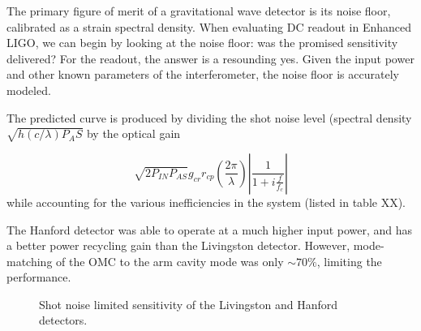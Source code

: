 \label{chapter5}


The primary figure of merit of a gravitational wave detector is its
noise floor, calibrated as a strain spectral density.  When evaluating
DC readout in Enhanced LIGO, we can begin by looking at the noise
floor: was the promised sensitivity delivered?  For the readout, the
answer is a resounding yes.  Given the input power and other known
parameters of the interferometer, the noise floor is accurately
modeled.


The predicted curve is produced by dividing the shot noise level
(spectral density $\sqrt{h (c/\lambda) P_AS}$ by the optical gain

$$\sqrt{2 P_{IN} P_{AS}} g_{cr} r_{cp}
\left(\frac{2\pi}{\lambda}\right) \left| \frac{1}{1 +
  i\frac{f}{f_c}}\right|$$ while accounting for the various
inefficiencies in the system (listed in table XX).

The Hanford detector was able to operate at a much higher input power,
and has a better power recycling gain than the Livingston detector.
However, mode-matching of the OMC to the arm cavity mode was only
$\sim70\%$, limiting the performance.

\begin{figure}
\caption{\label{fig:shot-noise-limited-sensitivity}Shot noise limited sensitivity of the Livingston and Hanford detectors.}
\end{figure}



